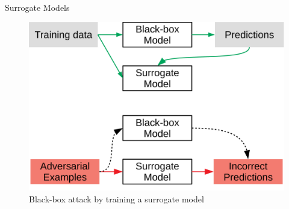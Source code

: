 \documentclass[9pt]{beamer}
\begin{document}
\begin{frame}{Surrogate Models}
\begin{figure}
    \centering
    \small
    \includegraphics[width=0.8\linewidth]{images/Surrogate model.pdf}
    \caption{Black-box attack by training a surrogate model}
    \label{fig:surrogate}
\end{figure}
\end{frame}
\end{document}
